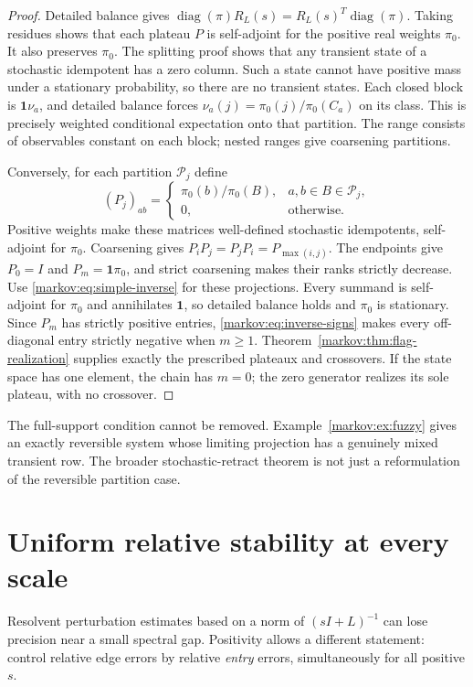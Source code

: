 \documentclass[11pt]{article}
\numberwithin{equation}{section}
\theoremstyle{definition}
\theoremstyle{remark}
\newcommand{\one}{\mathbf 1}
\newcommand{\diag}{\operatorname{diag}}
\begin{document}
\begin{proof}
Detailed balance gives
$\diag(\pi)R_L(s)=R_L(s)^T\diag(\pi)$. Taking residues shows that each plateau
$P$ is self-adjoint for the positive real weights $\pi_0$. It also preserves
$\pi_0$. The splitting proof shows that any transient state of a stochastic
idempotent has a zero column. Such a state cannot have positive mass under a
stationary probability, so there are no transient states. Each closed block is
$\one\nu_a$, and detailed balance forces
$\nu_a(j)=\pi_0(j)/\pi_0(C_a)$ on its class. This is precisely weighted
conditional expectation onto that partition. The range consists of observables
constant on each block; nested ranges give coarsening partitions.

Conversely, for each partition $\mathcal P_j$ define
\[
 (P_j)_{ab}=
 \begin{cases}
 \pi_0(b)/\pi_0(B),&a,b\in B\in\mathcal P_j,\\
 0,&\text{otherwise}.
 \end{cases}
\]
Positive weights make these matrices well-defined stochastic idempotents,
self-adjoint for $\pi_0$. Coarsening gives
$P_iP_j=P_jP_i=P_{\max(i,j)}$. The endpoints give $P_0=I$ and
$P_m=\one\pi_0$, and strict coarsening makes their ranks strictly decrease.
Use \eqref{markov:eq:simple-inverse} for these projections.
Every summand is self-adjoint for $\pi_0$ and annihilates $\one$, so
detailed balance holds and $\pi_0$ is stationary.
Since $P_m$ has strictly positive entries,
\eqref{markov:eq:inverse-signs} makes every off-diagonal entry strictly
negative when $m\ge1$. Theorem~\ref{markov:thm:flag-realization} supplies
exactly the prescribed plateaux and crossovers. If the state space has one
element, the chain has $m=0$; the zero generator realizes its sole plateau,
with no crossover.
\end{proof}

The full-support condition cannot be removed. Example~\ref{markov:ex:fuzzy} gives an
exactly reversible system whose limiting projection has a genuinely mixed
transient row. The broader stochastic-retract theorem is not just a reformulation
of the reversible partition case.

\section{Uniform relative stability at every scale}\label{markov:sec:stability}

Resolvent perturbation estimates based on a norm of $(sI+L)^{-1}$ can lose
precision near a small spectral gap. Positivity allows a different statement:
control relative edge errors by relative \emph{entry} errors, simultaneously for
all positive $s$.
\end{document}
